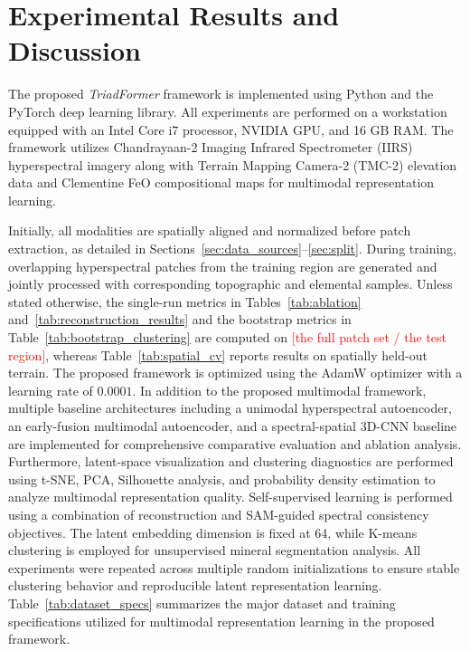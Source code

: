 \documentclass[pdflatex,sn-mathphys-num]{sn-jnl}
\newcommand{\fillin}[1]{\textcolor{red}{[#1]}}
\begin{document}
\section{Experimental Results and Discussion}

The proposed \textit{TriadFormer} framework is implemented using Python and the PyTorch deep learning library. All experiments are performed on a workstation equipped with an Intel Core i7 processor, NVIDIA GPU, and 16 GB RAM. The framework utilizes Chandrayaan-2 Imaging Infrared Spectrometer (IIRS) hyperspectral imagery along with Terrain Mapping Camera-2 (TMC-2) elevation data and Clementine FeO compositional maps for multimodal representation learning.

Initially, all modalities are spatially aligned and normalized before patch extraction, as detailed in Sections~\ref{sec:data_sources}--\ref{sec:split}. During training, overlapping hyperspectral patches from the training region are generated and jointly processed with corresponding topographic and elemental samples. Unless stated otherwise, the single-run metrics in Tables~\ref{tab:ablation} and~\ref{tab:reconstruction_results} and the bootstrap metrics in Table~\ref{tab:bootstrap_clustering} are computed on \fillin{the full patch set / the test region}, whereas Table~\ref{tab:spatial_cv} reports results on spatially held-out terrain. The proposed framework is optimized using the AdamW optimizer with a learning rate of \(0.0001\). In addition to the proposed multimodal framework, multiple baseline architectures including a unimodal hyperspectral autoencoder, an early-fusion multimodal autoencoder, and a spectral-spatial 3D-CNN baseline are implemented for comprehensive comparative evaluation and ablation analysis. Furthermore, latent-space visualization and clustering diagnostics are performed using t-SNE, PCA, Silhouette analysis, and probability density estimation to analyze multimodal representation quality. Self-supervised learning is performed using a combination of reconstruction and SAM-guided spectral consistency objectives. The latent embedding dimension is fixed at 64, while K-means clustering is employed for unsupervised mineral segmentation analysis. All experiments were repeated across multiple random initializations to ensure stable clustering behavior and reproducible latent representation learning. Table~\ref{tab:dataset_specs} summarizes the major dataset and training specifications utilized for multimodal representation learning in the proposed framework.
\end{document}

